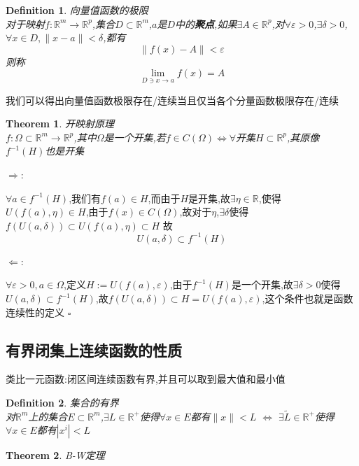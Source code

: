 \documentclass[11pt,hyperref,a4paper,UTF8]{ctexart}
\newtheorem{theorem}{Theorem}[subsection]
\newtheorem{definition}{Definition}[subsection]
\newenvironment{cproof}{%
\heiti{证明}\kaishu
}{%
  \hfill $\square$
  \par\bigskip
}
\newcommand{\RR}{\mathbb{R}}
\begin{document}
\begin{CJK}{UTF8}{gkai}
\begin{definition}
  向量值函数的极限\\
  对于映射$f: \RR^m \to \RR^p$,集合$D \subset \RR^m$,$a$是$D$中的\textbf{聚点},如果$\exists A \in \RR^p$,对$\forall \varepsilon > 0$,$\exists \delta > 0$,$\forall x \in D, \|x - a\| < \delta$,都有
  \[\|f(x) - A\| < \varepsilon\]
  则称
  \[{\lim_{D \owns x \to a}} f(x) = A\]
\end{definition}
我们可以得出向量值函数极限存在/连续当且仅当各个分量函数极限存在/连续

\begin{theorem}
  开映射原理\\

  $f: \Omega \subset \RR^m \to \RR^p$,其中$\Omega$是一个开集,若$f \in C(\Omega) \Leftrightarrow \forall $开集$H \subset \RR^p$,其原像$f^{-1}(H)$也是开集
\end{theorem}

\begin{cproof}
  $\Rightarrow$:

  $\forall a \in f^{-1}(H)$,我们有$f(a) \in H$,而由于$H$是开集,故$\exists \eta \in \RR$,使得$U(f(a),\eta) \in H$,由于$f(x) \in C(\Omega)$,故对于$\eta$,$\exists \delta$使得$f(U(a,\delta)) \subset U(f(a),\eta) \subset H$
  故
  \[U(a,\delta) \subset f^{-1}(H)\]

  $\Leftarrow$:

  $\forall \varepsilon > 0,a \in \Omega$,定义$H := U(f(a),\varepsilon)$,由于$f^{-1}(H)$是一个开集,故$\exists \delta > 0$使得$U(a,\delta) \subset f^{-1}(H)$,故$f(U(a,\delta)) \subset H = U(f(a),\varepsilon)$,这个条件也就是函数连续性的定义
\end{cproof}

\subsection{有界闭集上连续函数的性质}

类比一元函数:闭区间连续函数有界,并且可以取到最大值和最小值

\begin{definition}
  集合的有界\\

  对$\RR^m$上的集合$E \subset \RR^m$,$\exists L \in \RR^+$使得$\forall x \in E$都有$\|x\| < L$ $\Leftrightarrow$ $\exists \tilde{L} \in \RR^+$使得$\forall x \in E$都有$|x^i| < L$ 
\end{definition}

\begin{theorem}
  B-W定理\\


\end{theorem}
\end{CJK}
\end{document}

